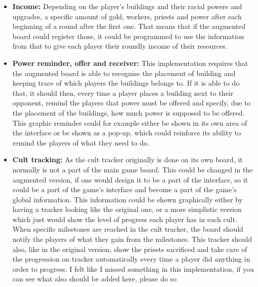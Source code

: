 \begin{itemize}
\item \textbf{Income:} Depending on the player's buildings and their racial powers and upgrades, a specific amount of gold, workers, priests and power after each beginning of a round after the first one. That means that if the augmented board could register those, it could be programmed to use the information from that to give each player their roundly income of their resources. 
\item \textbf{Power reminder, offer and receiver:} This implementation requires that the augmented board is able to recognise the placement of building and keeping trace of which players the buildings belongs to. If it is able to do that, it should then, every time a player places a building next to their opponent, remind the players that power must be offered and specify, due to the placement of the buildings, how much power is supposed to be offered. This graphic reminder could for example either be shown in its own area of the interface or be shown as a pop-up, which could reinforce its ability to remind the players of what they need to do.
\item \textbf{Cult tracking:} As the cult tracker originally is done on its own board, it normally is not a part of the main game board. This could be changed in the augmented version, if one would design it to be a part of the interface, so it could be a part of the game's interface and become a part of the game's global information. This information could be shown graphically either by having a tracker looking like the original one, or a more simplistic version which just would show the level of progress each player has in each cult. When specific milestones are reached in the cult tracker, the board should notify the players of what they gain from the milestones. This tracker should also, like in the original version, show the priests sacrificed and take care of the progression on tracker automatically every time a player did anything in order to progress. {I felt like I missed something in this implementation, if you can see what also should be added here, please do so}
\end{itemize}


